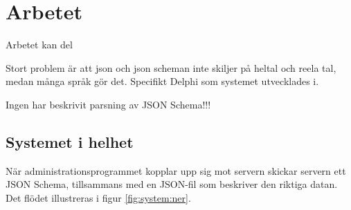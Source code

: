 \chapter{Arbetet}
Arbetet kan del


Stort problem är att json och json scheman inte skiljer på heltal och reela tal, medan många språk gör det. Specifikt Delphi som systemet utvecklades i.

Ingen har beskrivit parsning av JSON Schema!!!

\section{Systemet i helhet}

När administrationsprogrammet kopplar upp sig mot servern skickar servern ett JSON Schema, tillsammans med en JSON-fil som beskriver den riktiga datan. Det flödet illustreras i figur \ref{fig:system:ner}.

